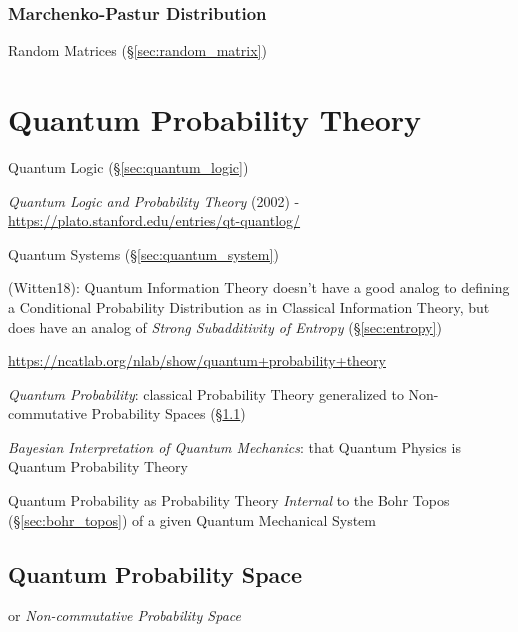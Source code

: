 \subsubsection{Marchenko-Pastur Distribution}\label{sec:marchenko_pastur}

Random Matrices (\S\ref{sec:random_matrix})



\section{Quantum Probability Theory}\label{sec:quantum_probability}

Quantum Logic (\S\ref{sec:quantum_logic})

\emph{Quantum Logic and Probability Theory} (2002) -
\url{https://plato.stanford.edu/entries/qt-quantlog/}

Quantum Systems (\S\ref{sec:quantum_system})

(Witten18): Quantum Information Theory doesn't have a good analog to defining a
Conditional Probability Distribution as in Classical Information Theory, but
does have an analog of \emph{Strong Subadditivity of Entropy}
(\S\ref{sec:entropy})

\url{https://ncatlab.org/nlab/show/quantum+probability+theory}

\emph{Quantum Probability}: classical Probability Theory generalized to
Non-commutative Probability Spaces (\S\ref{sec:quantum_probability_space})

\emph{Bayesian Interpretation of Quantum Mechanics}: that Quantum Physics is
Quantum Probability Theory

Quantum Probability as Probability Theory \emph{Internal} to the Bohr Topos
(\S\ref{sec:bohr_topos}) of a given Quantum Mechanical System



\subsection{Quantum Probability Space}\label{sec:quantum_probability_space}

or \emph{Non-commutative Probability Space}

